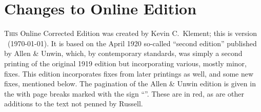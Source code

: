 \begin{flushleft}
\vspace{12pt}
\vspace{12pt}
\vspace{12pt}
\vspace{12pt}
\lxonly{\kkie{\phantom{Hi}}\kkie{\phantom{Hi}}}
\end{flushleft}
\allbutiphone{\end{multicols}}
\clearpage\iphoneonly{\pagestyle{empty}}\chapter*{Changes to Online Edition}\iphoneonly{\thispagestyle{empty}\vspace{-1.5cm}}\ebkonly{\thispagestyle{empty}}%
%
\noindent\textsc{This} Online Corrected Edition was created by Kevin C.\ Klement; this
is version \version\ (\today). It is based on the April 1920 so-called ``second edition''
published by Allen \& Unwin, \aftonly{\linebreak}which, by contemporary standards, was simply a
second printing of the original 1919 edition but incorporating various, mostly minor, fixes. 
This edition incorporates fixes from later printings as well, and some new
fixes, mentioned below. The
pagination of the Allen \& Unwin edition is given in the 
with page breaks marked with the sign ``\kkpmarkonly''. These are in red, as are other additions
to the text not penned by Russell.

